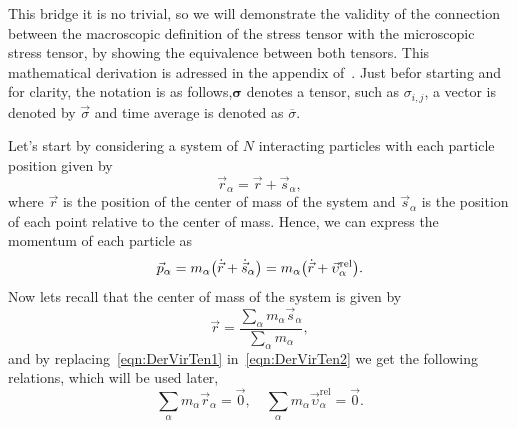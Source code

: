% 
This bridge it is no trivial, so we will demonstrate the validity of the connection between the macroscopic definition of the stress tensor with the microscopic stress tensor, by showing the equivalence between both tensors.
This mathematical derivation is adressed in the appendix of~\citep{admalUnifiedInterpretationStress2010}.
Just befor starting and for clarity, the notation is as follows,$\bm{\sigma}$ denotes a tensor, such as $\sigma_{i,j}$, a vector is denoted by $\vec{\sigma}$ and time average is denoted as $\overline{\sigma}$.

Let's start by considering a system of $N$ interacting particles with each particle position given by
\begin{equation}
    \vec{r}_{\alpha} = \vec{r} + \vec{s}_{\alpha}\label{eqn:DerVirTen1},
\end{equation}
where $\vec{r}$ is the position of the center of mass of the system and $\vec{s}_\alpha$ is the position of each point relative to the center of mass.
Hence, we can express the momentum of each particle as
\begin{equation}
    \vec{p}_\alpha = m_\alpha\qty(\dot{\vec{r}}+\dot{\vec{s}}_\alpha) = m_\alpha\qty(\dot{\vec{r}}+\vec{\upsilon}_\alpha^{\mathrm{rel}}).\label{eqn:DerVirTen2}
\end{equation}
Now lets recall that the center of mass of the system is given by
\begin{equation}
    \vec{r} = \frac{\sum_{\alpha}m_\alpha\vec{s}_\alpha}{\sum_{\alpha}m_\alpha}\label{eqn:DerVirTen3},
\end{equation}
and by replacing~\eqref{eqn:DerVirTen1} in~\eqref{eqn:DerVirTen2} we get the following relations, which will be used later,
\begin{equation}
    \sum_\alpha m_\alpha\vec{r}_\alpha = \vec{0},\quad
    \sum_\alpha m_\alpha\vec{\upsilon}_\alpha^{\mathrm{rel}} = \vec{0}.\label{eqn:DerVirTen4}
\end{equation}

